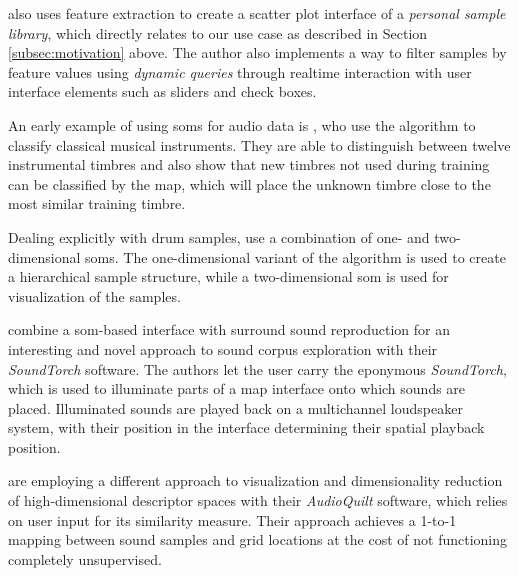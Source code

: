 \citet{coleman2007} also uses feature extraction to create a scatter plot
interface of a \textit{personal sample library}, which directly relates to our
use case as described in Section \ref{subsec:motivation} above. The author
also implements a way to filter samples by feature values using
\textit{dynamic queries} through realtime interaction with user interface
elements such as sliders and check boxes.

An early example of using \glspl{som} for audio data is \citet{cosi1994}, who
use the algorithm to classify classical musical instruments. They are able to
distinguish between twelve instrumental timbres and also show that new timbres
not used during training can be classified by the map, which will place the
unknown timbre close to the most similar training timbre.

\smallskip

Dealing explicitly with drum samples, \citet{pampalk2004} use a combination of
one- and two-dimensional \glspl{som}. The one-dimensional variant of the
algorithm is used to create a hierarchical sample structure, while a
two-dimensional \gls{som} is used for visualization of the samples.

\smallskip

\citet{heise2008} combine a \gls{som}-based interface with surround sound
reproduction for an interesting and novel approach to sound corpus exploration
with their \textit{SoundTorch} software. The authors let the user carry the
eponymous \textit{SoundTorch}, which is used to illuminate parts of a map
interface onto which sounds are placed. Illuminated sounds are played back on a
multichannel loudspeaker system, with their position in the interface
determining their spatial playback position.

\smallskip

\citet{fried2014} are employing a different approach to visualization and
dimensionality reduction of high-dimensional descriptor spaces with their
\textit{AudioQuilt} software, which relies on user input for its similarity
measure. Their approach achieves a 1-to-1 mapping between sound samples and
grid locations at the cost of not functioning completely unsupervised.

\smallskip

